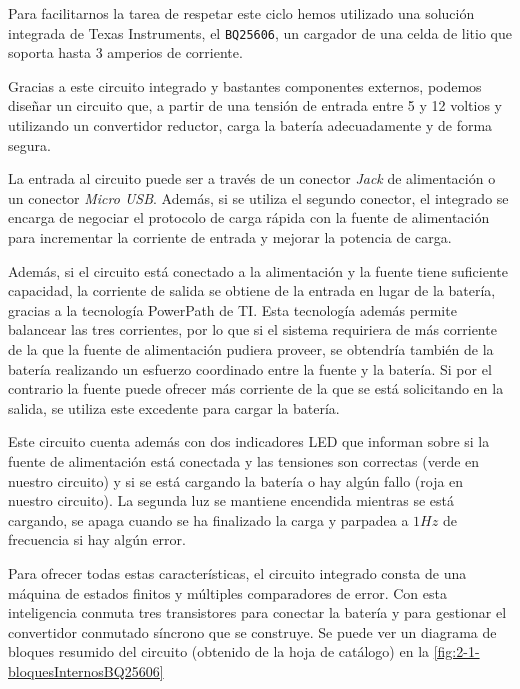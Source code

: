 Para facilitarnos la tarea de respetar este ciclo hemos utilizado una solución integrada de Texas Instruments, el \texttt{BQ25606}, un cargador de una celda de litio que soporta hasta 3 amperios de corriente. \cite{BQ25606DataSheet}

Gracias a este circuito integrado y bastantes componentes externos, podemos diseñar un circuito que, a partir de una tensión de entrada entre 5 y 12 voltios y utilizando un convertidor reductor, carga la batería adecuadamente y de forma segura. 

La entrada al circuito puede ser a través de un conector \textit{Jack} de alimentación o un conector \textit{Micro USB}. Además, si se utiliza el segundo conector, el integrado se encarga de negociar el protocolo de carga rápida con la fuente de alimentación para incrementar la corriente de entrada y mejorar la potencia de carga. 

Además, si el circuito está conectado a la alimentación y la fuente tiene suficiente capacidad, la corriente de salida se obtiene de la entrada en lugar de la batería, gracias a la tecnología PowerPath de TI. Esta tecnología además permite balancear las tres corrientes, por lo que si el sistema requiriera de más corriente de la que la fuente de alimentación pudiera proveer, se obtendría también de la batería realizando un esfuerzo coordinado entre la fuente y la batería. Si por el contrario la fuente puede ofrecer más corriente de la que se está solicitando en la salida, se utiliza este excedente para cargar la batería.

Este circuito cuenta además con dos indicadores LED que informan sobre si la fuente de alimentación está conectada y las tensiones son correctas (verde en nuestro circuito) y si se está cargando la batería o hay algún fallo (roja en nuestro circuito). La segunda luz se mantiene encendida mientras se está cargando, se apaga cuando se ha finalizado la carga y parpadea a $1 Hz$ de frecuencia si hay algún error.

Para ofrecer todas estas características, el circuito integrado consta de una máquina de estados finitos y múltiples comparadores de error. Con esta inteligencia conmuta tres transistores para conectar la batería y para gestionar el convertidor conmutado síncrono que se construye. Se puede ver un diagrama de bloques resumido del circuito (obtenido de la hoja de catálogo) en la \autoref{fig:2-1-bloquesInternosBQ25606}

